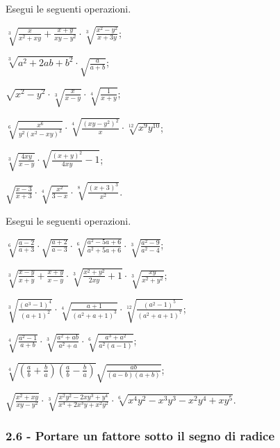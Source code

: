 \begin{esercizio}[\Ast]
 \label{ese:2.47}
Esegui le seguenti operazioni.
 \begin{enumeratea}
 \item $\sqrt[3]{\frac{x}{x^2+xy}+\frac{x+y}{xy-y^2}}\cdot\sqrt[3]{\frac{x^2-y^2}{x+3y}}$;
 \item $\sqrt[3]{a^2+2ab+b^2}\cdot\sqrt{\frac{a}{a+b}}$;
 \item $\sqrt{x^2-y^2}\cdot\sqrt[3]{\frac{x}{x-y}}\cdot\sqrt[4]{\frac{1}{x+y}}$;
 \item $\sqrt[6]{\frac{x^6}{y^2(x^2-xy)^3}}\cdot\sqrt[4]{\frac{(xy-y^2)^2}{x}}\cdot\sqrt[12]{x^9y^{10}}$;
 \item $\sqrt[3]{\frac{4xy}{x-y}}\cdot\sqrt{\frac{(x+y)^2}{4xy}-1}$;
 \item $\sqrt{\frac{x-3}{x+3}}\cdot\sqrt[4]{\frac{x^2}{3-x}}\cdot\sqrt[8]{\frac{(x+3)^3}{x^2}}$.
 \end{enumeratea}
\end{esercizio}

\begin{esercizio}[\Ast]
 \label{ese:2.48}
Esegui le seguenti operazioni.
 \begin{enumeratea}
 \item $\sqrt[6]{\frac{a-2}{a+3}}\cdot\sqrt{\frac{a+2}{a-3}}\cdot\sqrt[6]{\frac{a^2-5a+6}{a^2+5a+6}}\cdot\sqrt[3]{\frac{a^2-9}{a^2-4}}$;
 \item $\sqrt[3]{\frac{x-y}{x+y}+\frac{x+y}{x-y}}\cdot\sqrt[3]{\frac{x^2+y^2}{2xy}+1}\cdot\sqrt[3]{\frac{xy}{x^2+y^2}}$;
 \item $\sqrt[3]{\frac{(a^3-1)^4}{(a+1)^2}}\cdot\sqrt[4]{\frac{a+1}{(a^2+a+1)^3}}\cdot\sqrt[12]{\frac{(a^2-1)^5}{(a^2+a+1)^7}}$;
 \item $\sqrt[4]{\frac{a^2-1}{a+b}}\cdot\sqrt[3]{\frac{a^2+ab}{a^2+a}}\cdot\sqrt[6]{\frac{a^3+a^2}{a^2(a-1)}}$;
 \item $\sqrt[4]{\left(\frac{a}{b}+\frac{b}{a}\right)\left(\frac{a}{b}-\frac{b}{a}\right)}\sqrt{\frac{ab}{(a-b)(a+b)}}$;
 \item $\sqrt{\frac{x^2+xy}{xy-y^2}}\cdot\sqrt[3]{\frac{x^2y^2-2xy^3+y^4}{x^4+2x^3y+x^2y^2}}\cdot\sqrt[6]{x^4y^2-x^3y^3-x^2y^4+xy^5}$.
 \end{enumeratea}
\end{esercizio}

\subsubsection*{2.6 - Portare un fattore sotto il segno di radice}

